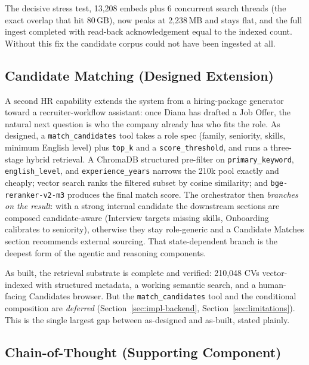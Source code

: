 The decisive stress test, 13,208 embeds plus 6 concurrent search threads (the exact
overlap that hit 80\,GB), now peaks at 2,238\,MB and stays flat, and the full ingest
completed with read-back acknowledgement equal to the indexed count. Without this fix the
candidate corpus could not have been ingested at all.

\subsection{Candidate Matching (Designed Extension)}
\label{sec:candidates}

A second HR capability extends the system from a hiring-package generator toward a
recruiter-workflow assistant: once Diana has drafted a Job Offer, the natural next question
is who the company already has who fits the role. As designed, a \verb|match_candidates|
tool takes a role spec (family, seniority, skills, minimum English level) plus
\verb|top_k| and a \verb|score_threshold|, and runs a three-stage hybrid retrieval. A
ChromaDB structured pre-filter on \verb|primary_keyword|, \verb|english_level|, and
\verb|experience_years| narrows the 210k pool exactly and cheaply; vector search ranks the
filtered subset by cosine similarity; and \verb|bge-reranker-v2-m3| produces the final
match score. The orchestrator then \emph{branches on the result}: with a strong internal
candidate the downstream sections are composed candidate-aware (Interview targets missing
skills, Onboarding calibrates to seniority), otherwise they stay role-generic and a
Candidate Matches section recommends external sourcing. That state-dependent branch is the
deepest form of the agentic and reasoning components.

As built, the retrieval substrate is complete and verified: 210,048 CVs vector-indexed
with structured metadata, a working semantic search, and a human-facing Candidates
browser. But the \verb|match_candidates| tool and the conditional composition are
\emph{deferred} (Section~\ref{sec:impl-backend}, Section~\ref{sec:limitations}). This is
the single largest gap between as-designed and as-built, stated plainly.

\subsection{Chain-of-Thought (Supporting Component)}
\label{sec:cot}


